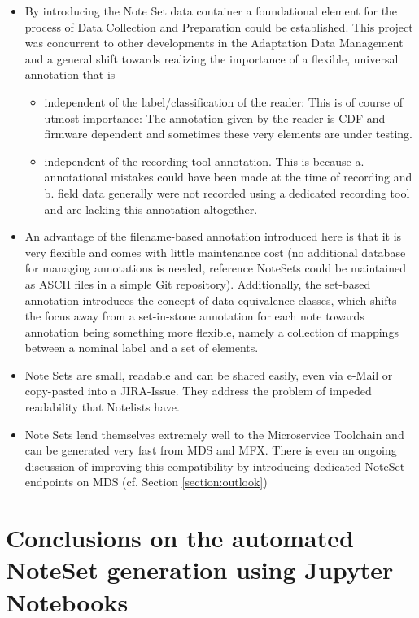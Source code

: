 \begin{itemize}
\item By introducing the Note Set data container a foundational element for the process of Data Collection and Preparation could be established. This project was concurrent to other developments in the Adaptation Data Management and a general shift towards realizing the importance of a flexible, universal annotation that is
	\begin{itemize}
		\item independent of the label/classification of the reader: This is of course of utmost importance: The annotation given by the reader is CDF and firmware dependent and sometimes these very elements are under testing.
		\item independent of the recording tool annotation. This is because a. annotational mistakes could have been made at the time of recording and b. field data generally were not recorded using a dedicated recording tool and are lacking this annotation altogether. 
	\end{itemize}
\item An advantage of the filename-based annotation introduced here is that it is very flexible and comes with little maintenance cost (no additional database for managing annotations is needed, reference NoteSets could be maintained as ASCII files in a simple Git repository). Additionally, the set-based annotation introduces the concept of data equivalence classes, which shifts the focus away from a set-in-stone annotation for each note towards annotation being something more flexible, namely a collection of mappings between a nominal label and a set of elements.
\item Note Sets are small, readable and can be shared easily, even via e-Mail or copy-pasted into a JIRA-Issue. They address the problem of impeded readability that Notelists have.
\item Note Sets lend themselves extremely well to the Microservice Toolchain and can be generated very fast from MDS and MFX. There is even an ongoing discussion of improving this compatibility by introducing dedicated NoteSet endpoints on MDS (cf. Section \ref{section:outlook})
\end{itemize}



\section{Conclusions on the automated NoteSet generation using Jupyter Notebooks}

